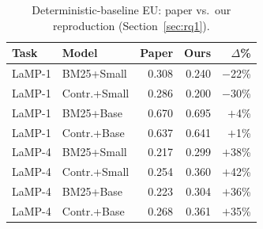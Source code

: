 \documentclass[10pt,twocolumn]{article}
\begin{document}
\begin{table}[h]
\centering
\small
\caption{Deterministic-baseline EU: paper vs.\ our reproduction (Section~\ref{sec:rq1}).}
\label{tab:baseline}
\begin{tabular}{@{}llrrr@{}}
\toprule
Task & Model & Paper & Ours & $\Delta$\% \\
\midrule
LaMP-1 & BM25+Small       & 0.308 & 0.240 & $-$22\% \\
LaMP-1 & Contr.+Small     & 0.286 & 0.200 & $-$30\% \\
LaMP-1 & BM25+Base        & 0.670 & 0.695 & $+$4\% \\
LaMP-1 & Contr.+Base      & 0.637 & 0.641 & $+$1\% \\
LaMP-4 & BM25+Small       & 0.217 & 0.299 & $+$38\% \\
LaMP-4 & Contr.+Small     & 0.254 & 0.360 & $+$42\% \\
LaMP-4 & BM25+Base        & 0.223 & 0.304 & $+$36\% \\
LaMP-4 & Contr.+Base      & 0.268 & 0.361 & $+$35\% \\
\bottomrule
\end{tabular}
\end{table}
\end{document}
